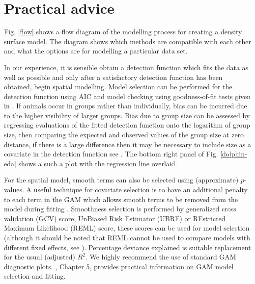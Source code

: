 \documentclass[a4paper,12pt]{article}
\begin{document}
\section*{Practical advice}
\label{s:practical}

Fig. \ref{flow} shows a flow diagram of the modelling process for creating a density surface model. The diagram shows which methods are compatible with each other and what the options are for modelling a particular data set.

In our experience, it is sensible obtain a detection function which fits the data as well as possible and only after a satisfactory detection function has been obtained, begin spatial modelling. Model selection can be performed for the detection function using AIC and model checking using goodness-of-fit tests given in \cite{Buckland:2004ts}.  If animals occur in groups rather than individually, bias can be incurred due to the higher visibility of larger groups. Bias due to group size can be assessed by regressing evaluations of the fitted detection function onto the logarithm of group size, then comparing the expected and observed values of the group size at zero distance, if there is a large difference then it may be necessary to include size as a covariate in the detection function see \citep[see][Section 4.8.2.4]{Buckland:2001vm}. The bottom right panel of Fig. \ref{dolphin-eda} shows a such a plot with the regression line overlaid.

For the spatial model, smooth terms can also be selected using (approximate) $p$-values. A useful technique for covariate selection is to have an additional penalty to each term in the GAM which allows smooth terms to be removed from the model during fitting \citep[this is illustrated in the example analysis][Section 4.1.6]{Wood:2006wz}. Smoothness selection is performed by generalized cross validation (GCV) score, UnBiased Risk Estimator (UBRE) or REstricted Maximum Likelihood (REML) score, these scores can be used for model selection (although it should be noted that REML cannot be used to compare models with different fixed effects, see \cite{Wood:ub}). Percentage deviance explained is suitable replacement for the usual (adjusted) $R^2$. We highly recommend the use of standard GAM diagnostic plots. \cite{Wood:2006wz}, Chapter 5, provides practical information on GAM model selection and fitting.
\end{document}
